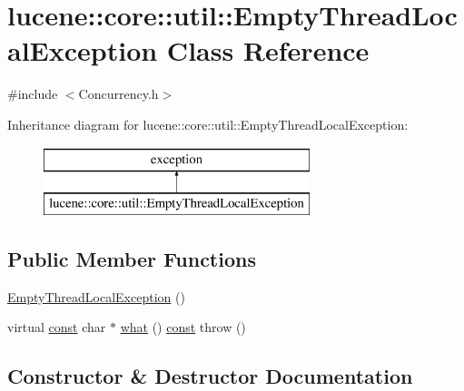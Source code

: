\hypertarget{classlucene_1_1core_1_1util_1_1EmptyThreadLocalException}{}\section{lucene\+:\+:core\+:\+:util\+:\+:Empty\+Thread\+Local\+Exception Class Reference}
\label{classlucene_1_1core_1_1util_1_1EmptyThreadLocalException}


{\ttfamily \#include $<$Concurrency.\+h$>$}

Inheritance diagram for lucene\+:\+:core\+:\+:util\+:\+:Empty\+Thread\+Local\+Exception\+:\begin{figure}[H]
\begin{center}
\leavevmode
\includegraphics[height=2.000000cm]{classlucene_1_1core_1_1util_1_1EmptyThreadLocalException}
\end{center}
\end{figure}
\subsection*{Public Member Functions}
\begin{DoxyCompactItemize}
\item 
\mbox{\hyperlink{classlucene_1_1core_1_1util_1_1EmptyThreadLocalException_a241a95d08b41259f7cb3c5d4a399b098}{Empty\+Thread\+Local\+Exception}} ()
\item 
virtual \mbox{\hyperlink{ZlibCrc32_8h_a2c212835823e3c54a8ab6d95c652660e}{const}} char $\ast$ \mbox{\hyperlink{classlucene_1_1core_1_1util_1_1EmptyThreadLocalException_a33f16d7924d5b7b094c1af85ff8268ef}{what}} () \mbox{\hyperlink{ZlibCrc32_8h_a2c212835823e3c54a8ab6d95c652660e}{const}}  throw ()
\end{DoxyCompactItemize}


\subsection{Constructor \& Destructor Documentation}
\mbox{\label{classlucene_1_1core_1_1util_1_1EmptyThreadLocalException_a241a95d08b41259f7cb3c5d4a399b098}} 
